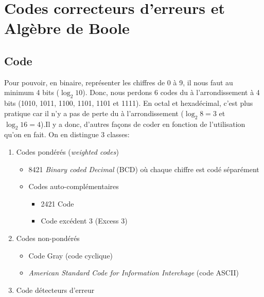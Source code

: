 \chapter{Codes correcteurs d'erreurs et Algèbre de Boole}
\section{Code}
Pour pouvoir, en binaire, représenter les chiffres de 0 à 9, il nous faut au minimum 4 bits ($\log_2 10$). Donc, nous perdons 6 codes du à l'arrondissement à 4 bits (1010, 1011, 1100, 1101, 1101 et 1111). En octal et hexadécimal, c'est plus pratique car il n'y a pas de perte du à l'arrondissement ($\log_2 8=3$ et $\log_2 16=4$).Il y a donc, d'autres façons de coder en fonction de l'utilisation qu'on en fait. On en distingue 3 classes: 
\begin{enumerate}
	\item 	Codes pondérés (\textit{weighted codes})
	\begin{itemize}
		\item 8421 \textit{Binary coded Decimal} (BCD) où chaque chiffre est codé séparément
		\item Codes auto-complémentaires
		\begin{itemize}
			\item 2421 Code
			\item Code excédent 3 (Excess 3)
		\end{itemize}
	\end{itemize}
	\item Codes non-pondérés
	\begin{itemize}
		\item Code Gray (code cyclique)
		\item \textit{American Standard Code for Information Interchage} (code ASCII)
	\end{itemize}
	\item Code détecteurs d'erreur
\end{enumerate}

